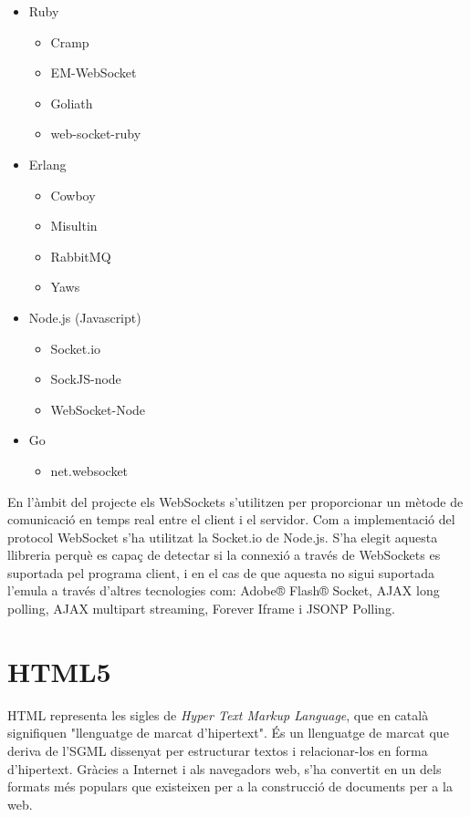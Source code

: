 \begin{itemize}
{    }
    \item{Ruby
    \begin{itemize}
        \item{Cramp}
        \item{EM-WebSocket}
        \item{Goliath}
        \item{web-socket-ruby}
    \end{itemize}
    }
    \item{Erlang
    \begin{itemize}
        \item{Cowboy}
        \item{Misultin}
        \item{RabbitMQ}
        \item{Yaws}
    \end{itemize}
    }
    \item{Node.js (Javascript)
    \begin{itemize}
        \item{Socket.io}
        \item{SockJS-node}
        \item{WebSocket-Node}
    \end{itemize}
    }
    \item{Go
    \begin{itemize}
        \item{net.websocket}
    \end{itemize}
    }
\end{itemize}    

En l'àmbit del projecte els WebSockets s'utilitzen per proporcionar un mètode de comunicació en temps real entre el client i el servidor. Com a implementació del protocol WebSocket s'ha utilitzat la Socket.io de Node.js. S'ha elegit aquesta llibreria perquè es capaç de detectar si la connexió a través de WebSockets es suportada pel programa client, i en el cas de que aquesta no sigui suportada l'emula a través d'altres tecnologies com:  Adobe® Flash® Socket,  AJAX long polling, AJAX multipart streaming, Forever Iframe i JSONP Polling.



\section{HTML5}

HTML representa les sigles de \emph{Hyper Text Markup Language}, que en català signifiquen "llenguatge de marcat d'hipertext". És un llenguatge de marcat que deriva de l'SGML dissenyat per estructurar textos i relacionar-los en forma d'hipertext. Gràcies a Internet i als navegadors web, s'ha convertit en un dels formats més populars que existeixen per a la construcció de documents per a la web. 

